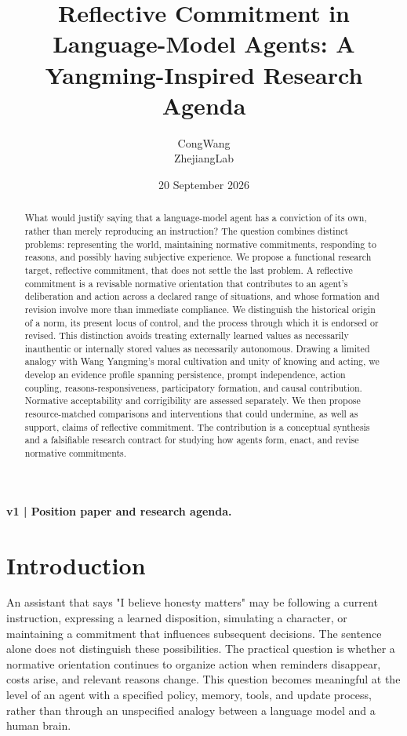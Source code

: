 \documentclass[11pt]{article}
\title{Reflective Commitment in Language-Model Agents: A Yangming-Inspired Research Agenda}
\author{CongWang\\ZhejiangLab}
\date{20 September 2026}
\begin{document}
\maketitle
\begin{center}\small\textbf{v1 | Position paper and research agenda.}\end{center}


\begin{abstract}

What would justify saying that a language-model agent has a conviction of its own, rather than merely reproducing an instruction? The question combines distinct problems: representing the world, maintaining normative commitments, responding to reasons, and possibly having subjective experience. We propose a functional research target, reflective commitment, that does not settle the last problem. A reflective commitment is a revisable normative orientation that contributes to an agent's deliberation and action across a declared range of situations, and whose formation and revision involve more than immediate compliance. We distinguish the historical origin of a norm, its present locus of control, and the process through which it is endorsed or revised. This distinction avoids treating externally learned values as necessarily inauthentic or internally stored values as necessarily autonomous. Drawing a limited analogy with Wang Yangming's moral cultivation and unity of knowing and acting, we develop an evidence profile spanning persistence, prompt independence, action coupling, reasons-responsiveness, participatory formation, and causal contribution. Normative acceptability and corrigibility are assessed separately. We then propose resource-matched comparisons and interventions that could undermine, as well as support, claims of reflective commitment. The contribution is a conceptual synthesis and a falsifiable research contract for studying how agents form, enact, and revise normative commitments.

\end{abstract}

\section{Introduction}

An assistant that says "I believe honesty matters" may be following a current instruction, expressing a learned disposition, simulating a character, or maintaining a commitment that influences subsequent decisions. The sentence alone does not distinguish these possibilities. The practical question is whether a normative orientation continues to organize action when reminders disappear, costs arise, and relevant reasons change. This question becomes meaningful at the level of an agent with a specified policy, memory, tools, and update process, rather than through an unspecified analogy between a language model and a human brain.
\end{document}
